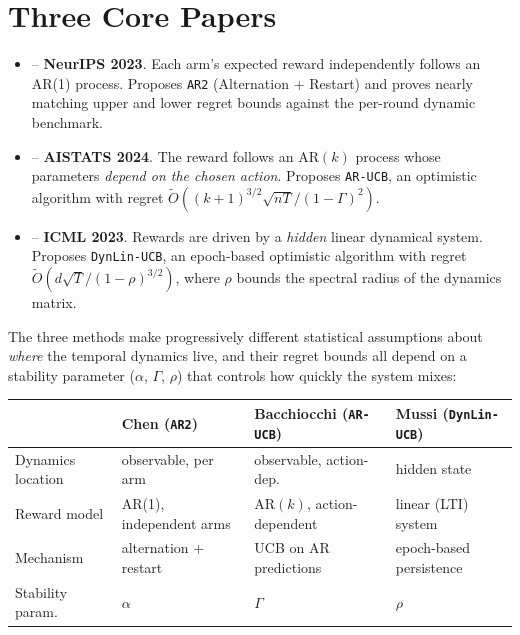 \documentclass[11pt]{article}
\begin{document}
\section{Three Core Papers}
\begin{itemize}
  \item \citet{chen2023ar2} -- \textbf{NeurIPS 2023}. Each arm's expected reward independently follows an AR(1) process. Proposes \texttt{AR2} (Alternation + Restart) and proves nearly matching upper and lower regret bounds against the per-round dynamic benchmark.
  \item \citet{bacchiocchi2024arucb} -- \textbf{AISTATS 2024}. The reward follows an AR$(k)$ process whose parameters \emph{depend on the chosen action}. Proposes \texttt{AR-UCB}, an optimistic algorithm with regret $\widetilde{O}((k+1)^{3/2}\sqrt{nT}/(1-\Gamma)^2)$. 
  \item \citet{mussi2023dlb} -- \textbf{ICML 2023}. Rewards are driven by a \emph{hidden} linear dynamical system. Proposes \texttt{DynLin-UCB}, an epoch-based optimistic algorithm with regret $\widetilde{O}(d\sqrt{T}/(1-\rho)^{3/2})$, where $\rho$ bounds the spectral radius of the dynamics matrix.
\end{itemize}

\noindent The three methods make progressively different statistical assumptions about \emph{where} the temporal dynamics live, and their regret bounds all depend on a stability parameter ($\alpha$, $\Gamma$, $\rho$) that controls how quickly the system mixes:

\begin{center}\small
\begin{tabular}{@{}llll@{}}
\toprule
& \textbf{Chen (\texttt{AR2})} & \textbf{Bacchiocchi (\texttt{AR-UCB})} & \textbf{Mussi (\texttt{DynLin-UCB})} \\
\midrule
Dynamics location  & observable, per arm        & observable, action-dep.   & hidden state          \\
Reward model       & AR(1), independent arms    & AR$(k)$, action-dependent & linear (LTI) system   \\
Mechanism          & alternation + restart      & UCB on AR predictions     & epoch-based persistence \\
Stability param.   & $\alpha$                   & $\Gamma$                  & $\rho$                \\
\bottomrule
\end{tabular}
\end{center}
\end{document}
